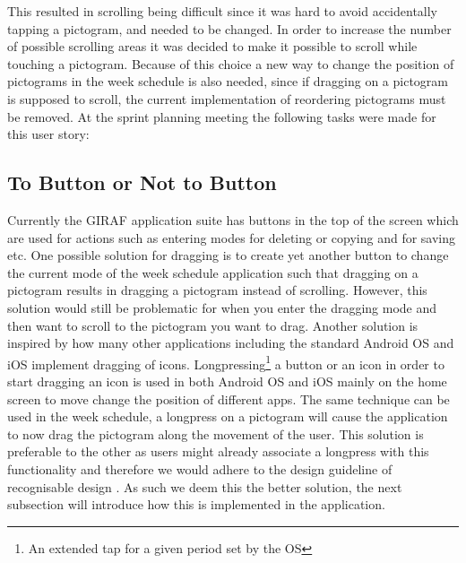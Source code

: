 This resulted in scrolling being difficult since it was hard to avoid accidentally tapping a pictogram, and needed to be changed.
In order to increase the number of possible scrolling areas it was decided to make it possible to scroll while touching a pictogram. 
Because of this choice a new way to change the position of pictograms in the week schedule is also needed, since if dragging on a pictogram is supposed to scroll, the current implementation of reordering pictograms must be removed. 
\bigskip \noindent
At the sprint planning meeting the following tasks were made for this user story:
\begin{enumberate}
    \item {}
    \item {}
\end{enumberate}
\subsection*{To Button or Not to Button} %
Currently the GIRAF application suite has buttons in the top of the screen which are used for actions such as entering modes for deleting or copying and for saving etc. 
One possible solution for dragging is to create yet another button to change the current mode of the week schedule application such that dragging on a pictogram results in dragging a pictogram instead of scrolling.
However, this solution would still be problematic for when you enter the dragging mode and then want to scroll to the pictogram you want to drag.
Another solution is inspired by how many other applications including the standard Android OS and iOS implement dragging of icons.
Longpressing\footnote{An extended tap for a given period set by the OS} a button or an icon in order to start dragging an icon is used in both Android OS and iOS mainly on the home screen to move change the position of different apps.
The same technique can be used in the week schedule, a longpress on a pictogram will cause the application to now drag the pictogram along the movement of the user.
This solution is preferable to the other as users might already associate a longpress with this functionality and therefore we would adhere to the design guideline of recognisable design \cite[p.~51]{DESIGNBOOK}.
As such we deem this the better solution, the next subsection will introduce how this is implemented in the application.


